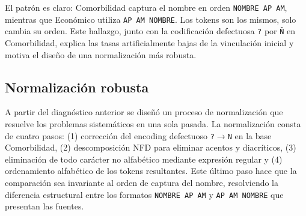 \begin{table}[H]
\centering
\small
\caption{Muestra de discrepancias --- Económico $\leftrightarrow$ Comorbilidad}
\label{tab:disc_v1_econ_comor}
\end{table}



El patrón es claro: Comorbilidad captura el nombre en orden \texttt{NOMBRE AP AM}, mientras que Económico utiliza \texttt{AP AM NOMBRE}. Los tokens son los mismos, solo cambia su orden. Este hallazgo, junto con la codificación defectuosa \texttt{?} por \texttt{Ñ} en Comorbilidad, explica las tasas artificialmente bajas de la vinculación inicial y motiva el diseño de una normalización más robusta.

\subsection{Normalización robusta}

A partir del diagnóstico anterior se diseñó un proceso de normalización que resuelve los problemas sistemáticos en una sola pasada. La normalización consta de cuatro pasos: (1) corrección del encoding defectuoso \texttt{?}$\to$\texttt{N} en la base Comorbilidad, (2) descomposición NFD para eliminar acentos y diacríticos, (3) eliminación de todo carácter no alfabético mediante expresión regular y (4) ordenamiento alfabético de los tokens resultantes. Este último paso hace que la comparación sea invariante al orden de captura del nombre, resolviendo la diferencia estructural entre los formatos \texttt{NOMBRE AP AM} y \texttt{AP AM NOMBRE} que presentan las fuentes.

